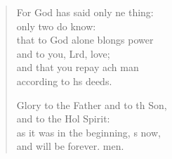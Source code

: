 \begin{verse}
\begin{patverse}
For God has said only ne thing:\Med\\
only two do  know:\\
that to God alone blongs power\Med\\
and to you, Lrd, love;\\
and that you repay ach man\Med\\
according to h\pointup{\i}s deeds.

Glory to the Father and to th Son,\Med\\
and to the Hol Spirit:\\
as it was in the beginning, \pointup{\i}s now,\Med\\
and will be forever. men. 
  \end{patverse}
\end{verse}

